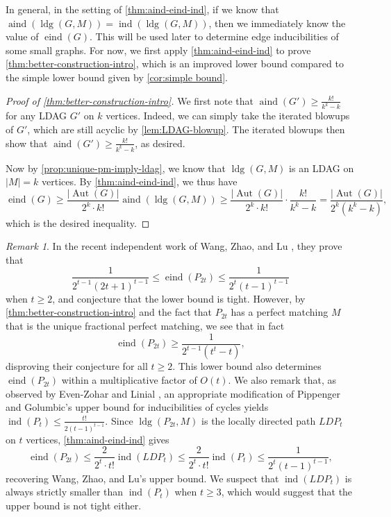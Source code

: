 \documentclass[reqno,11pt]{amsart}
\numberwithin{equation}{section}
\theoremstyle{definition}
\theoremstyle{remark}
\newtheorem*{remark}{Remark}
\newcommand{\abs}[1]{\left\lvert#1\right\rvert}
\DeclareMathOperator{\ind}{ind}
\DeclareMathOperator{\eind}{eind}
\DeclareMathOperator{\aind}{aind}
\DeclareMathOperator{\ldg}{ldg}
\DeclareMathOperator{\Aut}{Aut}
\begin{document}
In general, in the setting of \cref{thm:aind-eind-ind}, if we know that $\aind(\ldg(G,M)) = \ind(\ldg(G,M))$, then we immediately know the value of $\eind(G)$.
This will be used later to determine edge inducibilities of some small graphs.
For now, we first apply \cref{thm:aind-eind-ind} to prove \cref{thm:better-construction-intro}, which is an improved lower bound compared to the simple lower bound given by \cref{cor:simple bound}.

\begin{proof}[Proof of \cref{thm:better-construction-intro}]
    We first note that $\aind(G') \geq \frac{k!}{k^k-k}$ for any LDAG $G'$ on $k$ vertices.
    Indeed, we can simply take the iterated blowups of $G'$, which are still acyclic by \cref{lem:LDAG-blowup}.
    The iterated blowups then show that $\aind(G')\geq \frac{k!}{k^k-k}$, as desired.

    Now by \cref{prop:unique-pm-imply-ldag}, we know that $\ldg(G,M)$ is an LDAG on $\abs{M}=k$ vertices.
    By \cref{thm:aind-eind-ind}, we thus have
    \[\eind(G)\geq \frac{\abs{\Aut(G)}}{2^{k}\cdot k!}\aind(\ldg(G,M))\geq \frac{\abs{\Aut(G)}}{2^{k}\cdot k!}\cdot \frac{k!}{k^{k}-k} = \frac{\abs{\Aut(G)}}{2^{k}\left(k^{k}-k\right)},\]
    which is the desired inequality.
\end{proof}

\begin{remark}
    In the recent independent work of Wang, Zhao, and Lu \cite{WanZhaLu2025}, they prove that 
    \[\frac{1}{2^{t-1}(2t+1)^{t-1}}\leq \eind(P_{2t})\leq \frac{1}{2^t(t-1)^{t-1}}\]
    when $t\geq 2$, and conjecture that the lower bound is tight.
    However, by \cref{thm:better-construction-intro} and the fact that $P_{2t}$ has a perfect matching $M$ that is the unique fractional perfect matching, we see that in fact 
    \[\eind(P_{2t})\geq \frac{1}{2^{t-1}(t^t-t)},\]
    disproving their conjecture for all $t\geq 2$.
    This lower bound also determines $\eind(P_{2t})$ within a multiplicative factor of $O(t)$.
    We also remark that, as observed by Even-Zohar and Linial \cite{EveLin2015}, an appropriate modification of Pippenger and Golumbic's upper bound for inducibilities of cycles \cite[Theorem 9]{PipGol1975} yields $\ind(P_t)\leq \frac{t!}{2(t-1)^{t-1}}$.
    Since $\ldg(P_{2t},M)$ is the locally directed path $LDP_t$ on $t$ vertices, \cref{thm:aind-eind-ind} gives
    \[\eind(P_{2t})\leq \frac{2}{2^t\cdot t!}\ind(LDP_t)\leq \frac{2}{2^t\cdot t!}\ind(P_t)\leq \frac{1}{2^t(t-1)^{t-1}},\]
    recovering Wang, Zhao, and Lu's upper bound.
    We suspect that $\ind(LDP_t)$ is always strictly smaller than $\ind(P_t)$ when $t\geq 3$, which would suggest that the upper bound is not tight either.
\end{remark}
\end{document}
